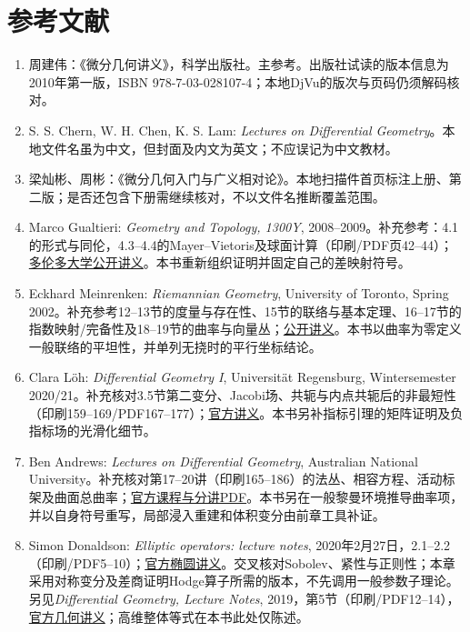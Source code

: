 \chapter{参考文献}
\begin{enumerate}
\item 周建伟：《微分几何讲义》，科学出版社。主参考。出版社试读的版本信息为2010年第一版，ISBN 978-7-03-028107-4；本地DjVu的版次与页码仍须解码核对。
\item S. S. Chern, W. H. Chen, K. S. Lam: \textit{Lectures on Differential Geometry}。本地文件名虽为中文，但封面及内文为英文；不应误记为中文教材。
\item 梁灿彬、周彬：《微分几何入门与广义相对论》。本地扫描件首页标注上册、第二版；是否还包含下册需继续核对，不以文件名推断覆盖范围。
\item Marco Gualtieri: \textit{Geometry and Topology, 1300Y}, 2008--2009。补充参考：4.1的形式与同伦，4.3--4.4的Mayer--Vietoris及球面计算（印刷/PDF页42--44）；\href{https://www.math.toronto.edu/mgualt/MAT1300/1300\%20Lecture\%20notes.pdf}{多伦多大学公开讲义}。本书重新组织证明并固定自己的差映射符号。
\item Eckhard Meinrenken: \textit{Riemannian Geometry}, University of Toronto, Spring 2002。补充参考12--13节的度量与存在性、15节的联络与基本定理、16--17节的指数映射/完备性及18--19节的曲率与向量丛；\href{https://www.math.toronto.edu/mein/teaching/LectureNotes/rieall.pdf}{公开讲义}。本书以曲率为零定义一般联络的平坦性，并单列无挠时的平行坐标结论。
\item Clara L\"oh: \textit{Differential Geometry I}, Universit\"at Regensburg, Wintersemester 2020/21。补充核对3.5节第二变分、Jacobi场、共轭与内点共轭后的非最短性（印刷159--169/PDF167--177）；\href{https://loeh.app.uni-regensburg.de/teaching/diffgeo_ws2021/lecture_notes.pdf}{官方讲义}。本书另补指标引理的矩阵证明及负指标场的光滑化细节。
\item Ben Andrews: \textit{Lectures on Differential Geometry}, Australian National University。补充核对第17--20讲（印刷165--186）的法丛、相容方程、活动标架及曲面总曲率；\href{https://maths-people.anu.edu.au/~andrews/DG/}{官方课程与分讲PDF}。本书另在一般黎曼环境推导曲率项，并以自身符号重写，局部浸入重建和体积变分由前章工具补证。
\item Simon Donaldson: \textit{Elliptic operators: lecture notes}, 2020年2月27日，2.1--2.2（印刷/PDF5--10）；\href{https://www.ma.imperial.ac.uk/~skdona/elliptic\%20operators.pdf}{官方椭圆讲义}。交叉核对Sobolev、紧性与正则性；本章采用对称变分及差商证明Hodge算子所需的版本，不先调用一般参数子理论。另见\textit{Differential Geometry, Lecture Notes}, 2019，第5节（印刷/PDF12--14），\href{https://www.ma.imperial.ac.uk/~skdona/differentialgeometrynotes.pdf}{官方几何讲义}；高维整体等式在本书此处仅陈述。

\end{enumerate}
